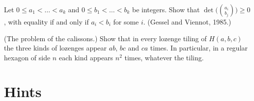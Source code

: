 \begin{exercise}[$\star\star$]\label{ex:vandermondelgv}
Let $0\le a_1<\dots<a_k$ and $0\le b_1<\dots<b_k$ be integers. Show that $\det\bigl(\binom{a_i}{b_j}\bigr)\ge0$, with equality
if and only if $a_i<b_i$ for some $i$. (Gessel and Viennot, 1985.)
\end{exercise}

\begin{exercise}[$\star\star$]\label{ex:calisson}
(The problem of the calissons.) Show that in every lozenge tiling of $H(a,b,c)$ the three kinds of lozenges appear $ab$,
$bc$ and $ca$ times. In particular, in a regular hexagon of side $n$ each kind appears $n^2$ times, whatever the tiling.
\end{exercise}

\section{Hints}

